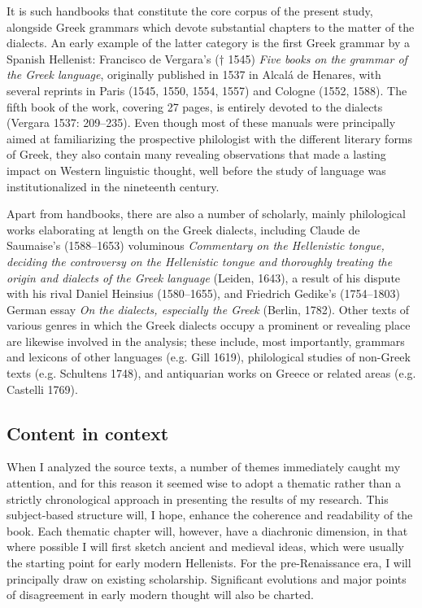 \begin{styleStandard}
It is such handbooks that constitute the core corpus of the present study, alongside Greek grammars which devote substantial chapters to the matter of the dialects. An early example of the latter category is the first Greek grammar by a Spanish Hellenist: Francisco de Vergara’s († 1545) \textit{Five books on the grammar of the Greek language}, originally published in 1537 in Alcalá de Henares, with several reprints in Paris (1545, 1550, 1554, 1557) and Cologne (1552, 1588). The fifth book of the work, covering 27 pages, is entirely devoted to the dialects (Vergara 1537: 209–235). Even though most of these manuals were principally aimed at familiarizing the prospective philologist with the different literary forms of Greek, they also contain many revealing observations that made a lasting impact on Western linguistic thought, well before the study of language was institutionalized in the nineteenth century.
\end{styleStandard}

\begin{styleStandard}
Apart from handbooks, there are also a number of scholarly, mainly philological works elaborating at length on the Greek dialects, including Claude de Saumaise’s (1588–1653) voluminous \textit{Commentary on the Hellenistic tongue, deciding the controversy on the Hellenistic tongue and thoroughly treating the origin and dialects of the Greek language} (Leiden, 1643), a result of his dispute with his rival Daniel Heinsius (1580–1655), and Friedrich Gedike’s (1754–1803) German essay \textit{On the dialects, especially the Greek} (Berlin, 1782). Other texts of various genres in which the Greek dialects occupy a prominent or revealing place are likewise involved in the analysis; these include, most importantly, grammars and lexicons of other languages (e.g. Gill 1619), philological studies of non-Greek texts (e.g. Schultens 1748), and antiquarian works on Greece or related areas (e.g. Castelli 1769).
\end{styleStandard}

\subsection{Content in context}
\hypertarget{Toc19704805}{}\begin{styleStandard}
When I analyzed the source texts, a number of themes immediately caught my attention, and for this reason it seemed wise to adopt a thematic rather than a strictly chronological approach in presenting the results of my research. This subject-based structure will, I hope, enhance the coherence and readability of the book. Each thematic chapter will, however, have a diachronic dimension, in that where possible I will first sketch ancient and medieval ideas, which were usually the starting point for early modern Hellenists. For the pre-Renaissance era, I will principally draw on existing scholarship. Significant evolutions and major points of disagreement in early modern thought will also be charted.
\end{styleStandard}

